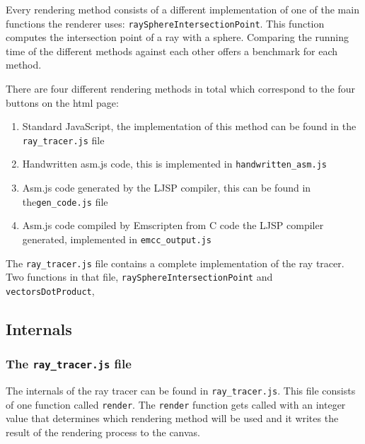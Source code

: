 \documentclass[11pt]{report}
\begin{document}

Every rendering method consists of a different implementation of one of the main functions the renderer uses: \texttt{raySphereIntersectionPoint}. This function computes the intersection point of a ray with a sphere. Comparing the running time of the different methods against each other offers a benchmark for each method.


There are four different rendering methods in total which correspond to the four buttons on the html page:

\begin{enumerate}
\item Standard JavaScript, the implementation of this method can be found in the \texttt{ray_tracer.js} file
\item Handwritten asm.js code, this is implemented in \texttt{handwritten_asm.js}
\item Asm.js code generated by the LJSP compiler, this can be found in the\texttt{gen_code.js} file
\item Asm.js code compiled by Emscripten from C code the LJSP compiler generated, implemented in \texttt{emcc_output.js}
\end{enumerate}
 

The \texttt{ray_tracer.js} file contains a complete implementation of the ray tracer. Two functions in that file, \texttt{raySphereIntersectionPoint} and \texttt{vectorsDotProduct}, 

\subsection{Internals}
\subsubsection{The \texttt{ray_tracer.js} file}
The internals of the ray tracer can be found in \texttt{ray_tracer.js}. This file consists of one function called \texttt{render}. The \texttt{render} function gets called with an integer value that determines which rendering method will be used and it writes the result of the rendering process to the canvas.
\end{document}

